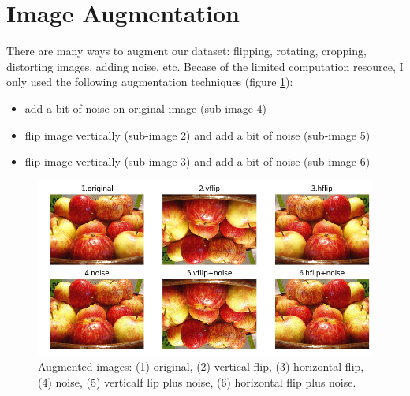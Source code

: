 \section{Image Augmentation}
There are many ways to augment our dataset: flipping, rotating, cropping, distorting images, adding noise, etc. Becase of the limited computation resource, I only used the following augmentation techniques (figure \ref{fig:augment1}):
\begin{itemize}
	\item add a bit of noise on original image (sub-image 4)
	\item flip image vertically (sub-image 2) and add a bit of noise (sub-image 5)
	\item flip image vertically (sub-image 3) and add a bit of noise (sub-image 6)
\end{itemize}
\begin{figure}[bh!]
	\centering
	\includegraphics[width=0.8\hsize]{./figures/augment1}
	\caption{Augmented images: (1) original, (2) vertical flip, (3) horizontal flip, (4) noise, (5) verticalf lip plus noise, (6) horizontal flip plus noise.}
	\label{fig:augment1}
\end{figure}


